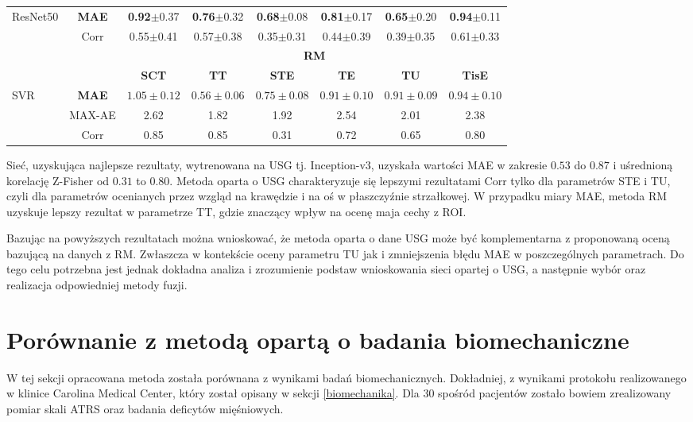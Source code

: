 \begin{table}[h]
\begin{tabular}{lc||c|c|c|c|c|c}
		ResNet50 & \textbf{MAE} & \textbf{0.92}$\pm$0.37 & \textbf{0.76}$\pm$0.32 & \textbf{0.68}$\pm$0.08 & \textbf{0.81}$\pm$0.17 & \textbf{0.65}$\pm$0.20 & \textbf{0.94}$\pm$0.11 \\
		& Corr & 0.55$\pm$0.41 & 0.57$\pm$0.38 & 0.35$\pm$0.31 & 0.44$\pm$0.39 & 0.39$\pm$0.35 & 0.61$\pm$0.33 \\ \hline \hline
				& & \multicolumn{6}{c}{\normalsize{\textbf{RM}}} \\
		& & \textbf{SCT} & \textbf{TT} & \textbf{STE} & \textbf{TE} & \textbf{TU} & \textbf{TisE}\\ \hline
		SVR & \textbf{MAE} & $1.05\pm0.12$ & $0.56\pm0.06$ & $0.75\pm0.08$ & $0.91\pm0.10$ & $0.91\pm0.09$ & $0.94\pm0.10$\\
		& MAX-AE & 2.62 & 1.82 & 1.92 & 2.54 & 2.01 & 2.38 \\
		& Corr   & 0.85 & 0.85 & 0.31 & 0.72 & 0.65 & 0.80 \\
		\hline \hline
	\end{tabular}
\end{table}

Sieć, uzyskująca najlepsze rezultaty, wytrenowana na USG tj. Inception-v3, uzyskała wartości MAE w zakresie $0.53$ do $0.87$ i uśrednioną korelację Z-Fisher od $0.31$ to $0.80$.
Metoda oparta o USG charakteryzuje się lepszymi rezultatami Corr tylko dla parametrów STE i TU, czyli dla parametrów ocenianych przez wzgląd na krawędzie i na oś w płaszczyźnie strzałkowej. W przypadku miary MAE, metoda RM uzyskuje lepszy rezultat w parametrze TT, gdzie znaczący wpływ na ocenę maja cechy z ROI.

Bazując na powyższych rezultatach można wnioskować, że metoda oparta o dane USG może być komplementarna z proponowaną oceną bazującą na danych z RM. Zwłaszcza w kontekście oceny parametru TU jak i zmniejszenia błędu MAE w poszczególnych parametrach. Do tego celu potrzebna jest jednak dokładna analiza i zrozumienie podstaw wnioskowania sieci opartej o USG, a następnie wybór oraz realizacja odpowiedniej metody fuzji.

\section{Porównanie z metodą opartą o badania biomechaniczne}

W tej sekcji opracowana metoda została porównana z wynikami badań biomechanicznych. Dokładniej, z wynikami protokołu realizowanego w klinice Carolina Medical Center, który został opisany w sekcji \ref{biomechanika}. Dla 30 spośród pacjentów zostało bowiem zrealizowany pomiar skali ATRS oraz badania deficytów mięśniowych.

